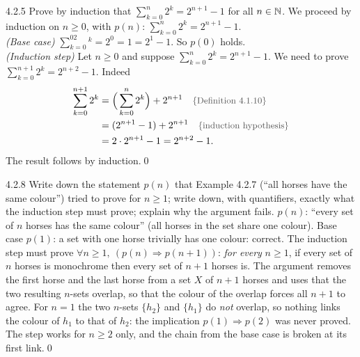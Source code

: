 \begin{bookex}[essential]{4.2.5}
Prove by induction that $\sum_{k=0}^n2^k=2^{n+1}-1$ for all $n\in\mathbb{N}$.
\solution
We proceed by induction on $n\ge0$, with $p(n)$: $\sum_{k=0}^n2^k=2^{n+1}-1$.\\
\emph{(Base case)} $\sum_{k=0}^02^k=2^0=1=2^1-1$. So $p(0)$ holds.\\
\emph{(Induction step)} Let $n\ge0$ and suppose $\sum_{k=0}^n2^k=2^{n+1}-1$. We need to prove $\sum_{k=0}^{n+1}2^k=2^{n+2}-1$. Indeed
\begin{align*}
\sum_{k=0}^{n+1}2^k&=\Big(\sum_{k=0}^n2^k\Big)+2^{n+1}\reason{Definition 4.1.10}\\
&=(2^{n+1}-1)+2^{n+1}\reason{induction hypothesis}\\
&=2\cdot2^{n+1}-1=2^{n+2}-1 .
\end{align*}
The result follows by induction.\qed
\end{bookex}

\begin{bookex}[recommended]{4.2.8}
Write down the statement $p(n)$ that Example 4.2.7 (``all horses have the same colour'') tried to prove for $n\ge1$; write down, with quantifiers, exactly what the induction step must prove; explain why the argument fails.
\solution
$p(n)$: ``every set of $n$ horses has the same colour'' (all horses in the set share one colour). Base case $p(1)$: a set with one horse trivially has one colour: correct. The induction step must prove $\forall n\ge1,\ (p(n)\Rightarrow p(n+1))$: \emph{for every} $n\ge1$, if every set of $n$ horses is monochrome then every set of $n+1$ horses is. The argument removes the first horse and the last horse from a set $X$ of $n+1$ horses and uses that the two resulting $n$-sets overlap, so that the colour of the overlap forces all $n+1$ to agree. For $n=1$ the two $n$-sets $\{h_2\}$ and $\{h_1\}$ do \emph{not} overlap, so nothing links the colour of $h_1$ to that of $h_2$: the implication $p(1)\Rightarrow p(2)$ was never proved. The step works for $n\ge2$ only, and the chain from the base case is broken at its first link.\qed
\end{bookex}

